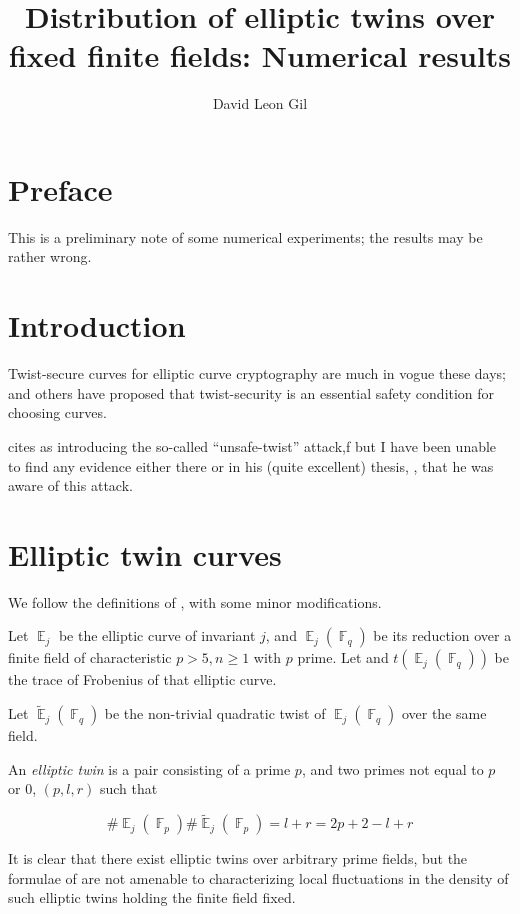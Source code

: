 \documentclass[11pt,fleqn]{article}
\title{Distribution of elliptic twins over fixed finite fields: Numerical results}
\author{David Leon Gil}
\newcommand{\Ej}{\ensuremath{\BbbE_j} }
\newcommand{\Ejfq}{\ensuremath{\BbbE_j(\BbbF_q)} }
\newcommand{\Ejfqt}{\ensuremath{\widetilde{\BbbE}_j(\BbbF_q)} }
\newcommand{\Ejfp}{\ensuremath{\BbbE_j(\BbbF_p)} }
\newcommand{\Ejfpt}{\ensuremath{\widetilde{\BbbE}_j(\BbbF_p)} }
\begin{document}
\maketitle

\section{Preface}

This is a preliminary note of some numerical experiments; the results
may be rather wrong.

\section{Introduction}

Twist-secure curves for elliptic curve cryptography are much in vogue
these days; \cite{djb} and others have proposed that twist-security
is an essential safety condition for choosing curves.

\cite{curve25519} cites \cite{KaliskiJCryptology} as introducing the
so-called ``unsafe-twist'' attack,f but I have been unable to find any
evidence either there or in his (quite excellent) thesis, \cite{KaliskiThesis},
that he was aware of this attack.

\section{Elliptic twin curves}

We follow the definitions of \autocite{ShparlinskiSutantyo}, with some minor
modifications.

Let $\Ej$ be the elliptic curve of invariant $j$, and $\Ejfq$ be its reduction
over a finite field of characteristic $p > 5, n \geq 1$ with $p$ prime. Let
and $t(\Ejfq)$ be the trace of Frobenius of that elliptic curve.

Let $\Ejfqt$ be the non-trivial quadratic twist of $\Ejfq$ over the same field.

An \emph{elliptic twin} is a pair consisting of a prime $p$, and two primes
not equal to $p$ or $0$, $(p, {l, r})$ such that

\begin{equation}
\#\Ejfp \#\Ejfpt = l + r = 2 p + 2 - l + r
\end{equation}

It is clear that there exist elliptic twins over arbitrary prime fields, but
the formulae of \autocite{ShparlinskiSutantyo} are not amenable to characterizing
local fluctuations in the density of such elliptic twins holding the finite
field fixed.
\end{document}
